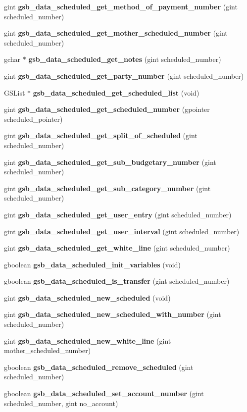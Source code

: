 \begin{DoxyCompactItemize}
\item 
gint {\bf gsb\_\-data\_\-scheduled\_\-get\_\-method\_\-of\_\-payment\_\-number} (gint scheduled\_\-number)
\item 
gint {\bf gsb\_\-data\_\-scheduled\_\-get\_\-mother\_\-scheduled\_\-number} (gint scheduled\_\-number)
\item 
gchar $\ast$ {\bf gsb\_\-data\_\-scheduled\_\-get\_\-notes} (gint scheduled\_\-number)
\item 
gint {\bf gsb\_\-data\_\-scheduled\_\-get\_\-party\_\-number} (gint scheduled\_\-number)
\item 
GSList $\ast$ {\bf gsb\_\-data\_\-scheduled\_\-get\_\-scheduled\_\-list} (void)
\item 
gint {\bf gsb\_\-data\_\-scheduled\_\-get\_\-scheduled\_\-number} (gpointer scheduled\_\-pointer)
\item 
gint {\bf gsb\_\-data\_\-scheduled\_\-get\_\-split\_\-of\_\-scheduled} (gint scheduled\_\-number)
\item 
gint {\bf gsb\_\-data\_\-scheduled\_\-get\_\-sub\_\-budgetary\_\-number} (gint scheduled\_\-number)
\item 
gint {\bf gsb\_\-data\_\-scheduled\_\-get\_\-sub\_\-category\_\-number} (gint scheduled\_\-number)
\item 
gint {\bf gsb\_\-data\_\-scheduled\_\-get\_\-user\_\-entry} (gint scheduled\_\-number)
\item 
gint {\bf gsb\_\-data\_\-scheduled\_\-get\_\-user\_\-interval} (gint scheduled\_\-number)
\item 
gint {\bf gsb\_\-data\_\-scheduled\_\-get\_\-white\_\-line} (gint scheduled\_\-number)
\item 
gboolean {\bf gsb\_\-data\_\-scheduled\_\-init\_\-variables} (void)
\item 
gboolean {\bf gsb\_\-data\_\-scheduled\_\-is\_\-transfer} (gint scheduled\_\-number)
\item 
gint {\bf gsb\_\-data\_\-scheduled\_\-new\_\-scheduled} (void)
\item 
gint {\bf gsb\_\-data\_\-scheduled\_\-new\_\-scheduled\_\-with\_\-number} (gint scheduled\_\-number)
\item 
gint {\bf gsb\_\-data\_\-scheduled\_\-new\_\-white\_\-line} (gint mother\_\-scheduled\_\-number)
\item 
gboolean {\bf gsb\_\-data\_\-scheduled\_\-remove\_\-scheduled} (gint scheduled\_\-number)
\item 
gboolean {\bf gsb\_\-data\_\-scheduled\_\-set\_\-account\_\-number} (gint scheduled\_\-number, gint no\_\-account)

\end{DoxyCompactItemize}
